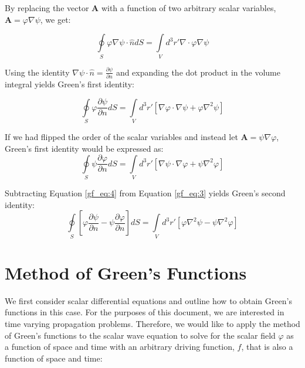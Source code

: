 By replacing the vector $\mathbf{A}$ with a function of two arbitrary scalar variables, $\mathbf{A}=\varphi\nabla\psi$, we get:

\begin{equation}
\oint\limits_{S} \varphi\nabla\psi \cdot \hat{n} dS = \int\limits_{V}d^3r'\nabla \cdot \varphi\nabla\psi
\label{gf_eq:2}
\end{equation}
\renewcommand{\baselinestretch}{2} \small\normalsize

Using the identity $\nabla\psi\cdot \hat{n} = \frac{\partial \psi}{\partial n}$ and expanding the dot product in the volume integral yields Green's first identity:

\begin{equation}
\boxed{\oint\limits_{S} \varphi\frac{\partial \psi}{\partial n} dS = \int\limits_{V}d^3r' \left[ \nabla\varphi \cdot \nabla\psi +\varphi \nabla^2 \psi\right]}
\label{gf_eq:3}
\end{equation}
\renewcommand{\baselinestretch}{2} \small\normalsize

If we had flipped the order of the scalar variables and instead let $\mathbf{A}=\psi\nabla\varphi$, Green's first identity would be expressed as:
\begin{equation}
\oint\limits_{S} \psi\frac{\partial \varphi}{\partial n} dS = \int\limits_{V}d^3r' \left[ \nabla\psi \cdot \nabla\varphi +\psi \nabla^2 \varphi\right]
\label{gf_eq:4}
\end{equation}
\renewcommand{\baselinestretch}{2} \small\normalsize

\noindent Subtracting Equation \ref{gf_eq:4} from Equation \ref{gf_eq:3} yields Green's second identity:
\begin{equation}
\boxed{\oint\limits_{S} \left[ \varphi\frac{\partial \psi}{\partial n} - \psi\frac{\partial \varphi}{\partial n} \right]dS = \int\limits_{V}d^3r' \left[ \varphi\nabla^2\psi- \psi \nabla^2 \varphi\right]}
\label{gf_eq:5}
\end{equation}

\section{Method of Green's Functions}
We first consider scalar differential equations and outline how to obtain Green's functions in this case. For the purposes of this document, we are interested in time varying propagation problems. Therefore, we would like to apply the method of Green's functions to the scalar wave equation  to solve for the scalar field $\varphi$ as a function of space and time with an arbitrary driving function, $f$, that is also a function of space and time:

